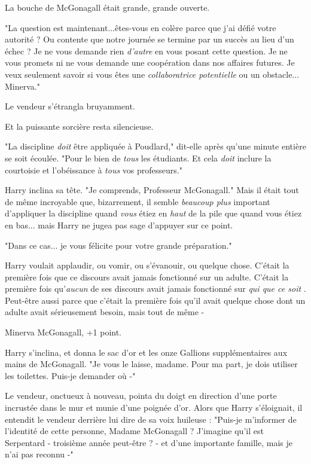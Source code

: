 La bouche de McGonagall était grande, grande ouverte.

"La question est maintenant...êtes-vous en colère parce que j'ai défié votre autorité ? Ou contente que notre journée se termine par un succès au lieu d'un échec ? Je ne vous demande rien \emph{d'autre}  en vous posant cette question. Je ne vous promets ni ne vous demande une coopération dans nos affaires futures. Je veux seulement savoir si vous êtes une \emph{collaboratrice potentielle}  ou un obstacle... Minerva."

Le vendeur s'étrangla bruyamment.

Et la puissante sorcière resta silencieuse.

"La discipline \emph{doit}  être appliquée à Poudlard," dit-elle après qu'une minute entière se soit écoulée. "Pour le bien de \emph{tous}  les étudiants. Et cela \emph{doit}  inclure la courtoisie et l'obéissance à \emph{tous}  vos professeurs."

Harry inclina sa tête. "Je comprends, Professeur McGonagall." Mais il était tout de même incroyable que, bizarrement, il semble \emph{beaucoup plus}  important d'appliquer la discipline quand \emph{vous}  étiez en \emph{haut}  de la pile que quand vous étiez en bas... mais Harry ne jugea pas sage d'appuyer sur ce point.

"Dans ce cas... je vous félicite pour votre grande préparation."

Harry voulait applaudir, ou vomir, ou s'évanouir, ou quelque chose. C'était la première fois que ce discours avait jamais fonctionné sur un adulte. C'était la première fois qu'\emph{aucun}  de ses discours avait jamais fonctionné sur \emph{qui que ce soit} . Peut-être aussi parce que c'était la première fois qu'il avait quelque chose dont un adulte avait sérieusement besoin, mais tout de même -

Minerva McGonagall, +1 point.

Harry s'inclina, et donna le sac d'or et les onze Gallions supplémentaires aux mains de McGonagall. "Je vous le laisse, madame. Pour ma part, je dois utiliser les toilettes. Puis-je demander où -"

Le vendeur, onctueux à nouveau, pointa du doigt en direction d'une porte incrustée dans le mur et munie d'une poignée d'or. Alors que Harry s'éloignait, il entendit le vendeur derrière lui dire de sa voix huileuse : "Puis-je m'informer de l'identité de cette personne, Madame McGonagall ? J'imagine qu'il est Serpentard - troisième année peut-être ? - et d'une importante famille, mais je n'ai pas reconnu -"

